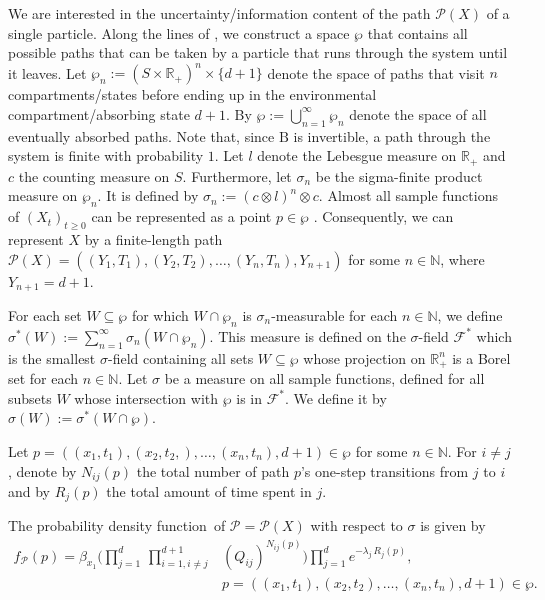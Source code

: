\documentclass[smallextended]{svjour3}
\renewcommand{\tens}[1]{\mathrm{#1}}
\newcommand{\R}{\mathbb{R}}
\newcommand{\N}{\mathbb{N}}
\newcommand{\prodl}{\prod\limits}
\newcommand{\pdf}{probability density function}
\begin{document}
We are interested in the uncertainty/information content of the path $\mathcal{P}(X)$ of a single particle.
Along the lines of \citet{Albert1962AMS}, we construct a space $\wp$ that contains all possible paths that can be taken by a particle that runs through the system until it leaves.
Let $\wp_n:=(S\times\R_+)^n\times\{d+1\}$ denote the space of paths that visit $n$ compartments/states before ending up in the environmental compartment/absorbing state $d+1$.
By $\wp:=\bigcup_{n=1}^{\infty}\wp_n$ denote the space of all eventually absorbed paths.
Note that, since $\tens{B}$ is invertible, a path through the system is finite with probability $1$.
Let $l$ denote the Lebesgue measure on $\R_+$ and $c$ the counting measure on $S$.
Furthermore, let $\sigma_n$ be the sigma-finite product measure on $\wp_n$.
It is defined by $\sigma_n:=(c\otimes l)^n \otimes c$.
Almost all sample functions of $(X_t)_{t\geq0}$ can be represented as a point $p\in\wp$ \citep[Chapter~VI]{Doob1953}.
Consequently, we can represent $X$ by a finite-length path $\mathcal{P}(X)=((Y_1,T_1),(Y_2,T_2),\ldots,(Y_n,T_n),Y_{n+1})$ for some $n\in\N$, where $Y_{n+1}=d+1$.

For each set $W\subseteq\wp$ for which $W\cap \wp_n$ is $\sigma_n$-measurable for each $n\in\N$, we define $\sigma^\ast(W) := \sum_{n=1}^{\infty} \sigma_n(W\cap\wp_n)$.
This measure is defined on the $\sigma$-field $\mathcal{F}^\ast$ which is the smallest $\sigma$-field containing all sets $W\subseteq\wp$ whose projection on $\R^n_+$ is a Borel set for each $n\in\N$.
Let $\sigma$ be a measure on all sample functions, defined for all subsets $W$ whose intersection with $\wp$ is in $\mathcal{F}^\ast$. 
We define it by $\sigma(W):=\sigma^*(W\cap\wp)$.

Let $p=((x_1,t_1),(x_2,t_2,),\ldots,(x_n,t_n),d+1)\in\wp$ for some $n\in\N$.
For $i\neq j$, denote by $N_{ij}(p)$ the total number of path $p$'s one-step transitions from $j$ to $i$ and by $R_j(p)$ the total amount of time spent in $j$.

\begin{mytheorem}\label{theorem:path_pdf}
	The \pdf\ of $\mathcal{P}=\mathcal{P}(X)$ with respect to $\sigma$ is given by
	\begin{equation}
    \begin{aligned}
      f_{\mathcal{P}}(p) = \beta_{x_1}\Bigg(\prodl_{j=1}^d\,\prodl_{i=1,i\neq j}^{d+1} &(Q_{ij})^{N_{ij}(p)}\Bigg)\prodl_{j=1}^d e^{-\lambda_j\,R_j(p)},\\
      & p=((x_1,t_1),(x_2,t_2),\ldots,(x_n,t_n),d+1)\in\wp.
    \end{aligned}
	\end{equation}
\end{mytheorem}
\end{document}
